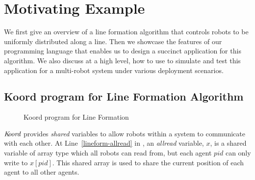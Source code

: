 \section{Motivating Example}
\label{sec:overview}



%


We first give an overview of a line formation algorithm that controls robots to be uniformly distributed along a line.
Then we showcase the features of our programming language \lgname that enables us to design a succinct application for this algorithm.
We also discuss at a high level, how to use \toolname to simulate and test this application for a multi-robot system under various deployment scenarios.


\subsection{Koord program for Line Formation Algorithm}

\begin{figure}[h!]
    {
        
    }
    {
        
    }
    \caption{Koord program for Line Formation}\label{fig:lineform}
\end{figure}

$\emph{K\kern-2pt oord}$ provides \emph{shared} variables to allow robots within a system to communicate with each other.
At Line~\ref{lineform-allread} in , an \emph{allread} variable, $x$, is a shared variable of array type which all robots can read from,
but each agent $pid$ can only write to $x[pid]$.
This shared array is used to share the current position of each agent to all other agents.





